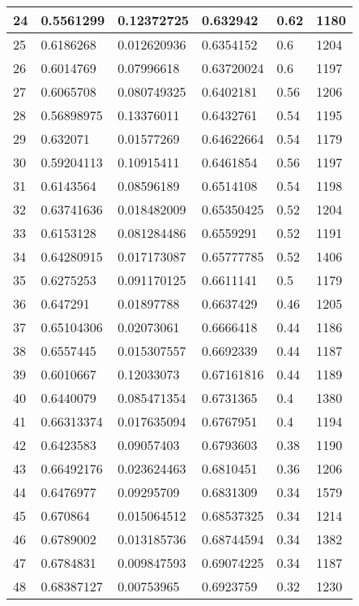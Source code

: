 \begin{longtable}{|l|l|l|l|l|l|}
24 & 0.5561299 & 0.12372725 & 0.632942 & 0.62 & 1180 \\ \hline 
25 & 0.6186268 & 0.012620936 & 0.6354152 & 0.6 & 1204 \\ \hline 
26 & 0.6014769 & 0.07996618 & 0.63720024 & 0.6 & 1197 \\ \hline 
27 & 0.6065708 & 0.080749325 & 0.6402181 & 0.56 & 1206 \\ \hline 
28 & 0.56898975 & 0.13376011 & 0.6432761 & 0.54 & 1195 \\ \hline 
29 & 0.632071 & 0.01577269 & 0.64622664 & 0.54 & 1179 \\ \hline 
30 & 0.59204113 & 0.10915411 & 0.6461854 & 0.56 & 1197 \\ \hline 
31 & 0.6143564 & 0.08596189 & 0.6514108 & 0.54 & 1198 \\ \hline 
32 & 0.63741636 & 0.018482009 & 0.65350425 & 0.52 & 1204 \\ \hline 
33 & 0.6153128 & 0.081284486 & 0.6559291 & 0.52 & 1191 \\ \hline 
34 & 0.64280915 & 0.017173087 & 0.65777785 & 0.52 & 1406 \\ \hline 
35 & 0.6275253 & 0.091170125 & 0.6611141 & 0.5 & 1179 \\ \hline 
36 & 0.647291 & 0.01897788 & 0.6637429 & 0.46 & 1205 \\ \hline 
37 & 0.65104306 & 0.02073061 & 0.6666418 & 0.44 & 1186 \\ \hline 
38 & 0.6557445 & 0.015307557 & 0.6692339 & 0.44 & 1187 \\ \hline 
39 & 0.6010667 & 0.12033073 & 0.67161816 & 0.44 & 1189 \\ \hline 
40 & 0.6440079 & 0.085471354 & 0.6731365 & 0.4 & 1380 \\ \hline 
41 & 0.66313374 & 0.017635094 & 0.6767951 & 0.4 & 1194 \\ \hline 
42 & 0.6423583 & 0.09057403 & 0.6793603 & 0.38 & 1190 \\ \hline 
43 & 0.66492176 & 0.023624463 & 0.6810451 & 0.36 & 1206 \\ \hline 
44 & 0.6476977 & 0.09295709 & 0.6831309 & 0.34 & 1579 \\ \hline 
45 & 0.670864 & 0.015064512 & 0.68537325 & 0.34 & 1214 \\ \hline 
46 & 0.6789002 & 0.013185736 & 0.68744594 & 0.34 & 1382 \\ \hline 
47 & 0.6784831 & 0.009847593 & 0.69074225 & 0.34 & 1187 \\ \hline 
48 & 0.68387127 & 0.00753965 & 0.6923759 & 0.32 & 1230 \\ \hline 

\end{longtable}

